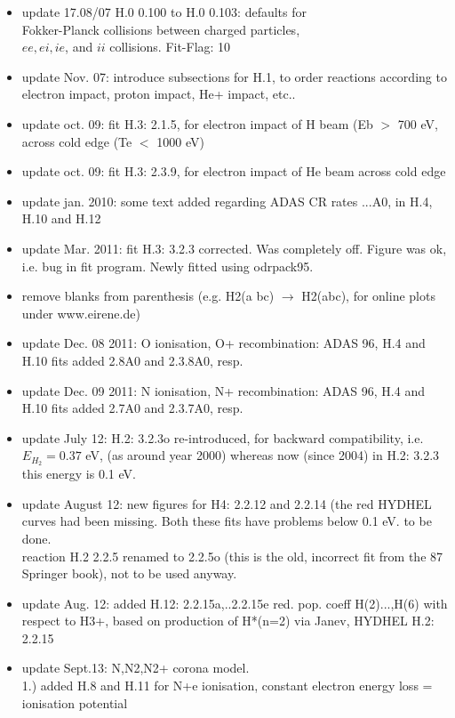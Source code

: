 \documentclass[12pt,dvips]{article}
\begin{document}
\begin{itemize}
  to be done: H.10 2.1.8 H.12 2.1.8de  (JH to be replaced by FU)
  \item update   17.08/07  H.0 0.100 to H.0 0.103: defaults for \\
  Fokker-Planck collisions between charged particles,\\
  $ee, ei, ie$, and $ii$ collisions. Fit-Flag: 10
  \item update Nov. 07:  introduce subsections for H.1, to order
  reactions according to electron impact, proton impact, He+ impact, etc..
  \item update oct. 09:  fit H.3: 2.1.5, for electron impact
  of H beam (Eb $>$ 700 eV, across cold edge (Te $<$ 1000 eV)
  \item update oct. 09:  fit H.3: 2.3.9, for electron impact
  of He beam across cold edge
  \item update jan. 2010: some text added regarding ADAS CR rates
  ...A0, in H.4, H.10 and H.12
  \item update Mar. 2011:  fit H.3: 3.2.3 corrected. Was completely off.
  Figure was ok, i.e. bug in fit program. Newly fitted using odrpack95.
  \item remove blanks from parenthesis (e.g. H2(a bc) $\rightarrow$ H2(abc), for online plots under www.eirene.de)
  \item update Dec. 08 2011:  O ionisation, O+ recombination: ADAS 96, H.4 and H.10 fits added 2.8A0 and 2.3.8A0, resp.
  \item update Dec. 09 2011:  N ionisation, N+ recombination: ADAS 96, H.4 and H.10 fits added 2.7A0 and 2.3.7A0, resp.
  \item update July 12:  H.2: 3.2.3o re-introduced, for backward compatibility, i.e. $E_{H_2}=0.37$ eV, (as around year 2000)
  whereas now (since 2004) in  H.2: 3.2.3 this energy is 0.1 eV.
  \item update August 12: new figures for H4: 2.2.12 and 2.2.14 (the red
  HYDHEL curves had been missing. Both these fits have problems below 0.1 eV. to be done.\\
  reaction H.2 2.2.5 renamed to 2.2.5o (this is the old, incorrect fit from the 87 Springer book),
  not to be used anyway.
  \item update Aug. 12: added H.12: 2.2.15a,..2.2.15e red. pop. coeff H(2)...,H(6) with respect to H3+,
  based on production of H*(n=2) via Janev, HYDHEL H.2: 2.2.15
  \item update Sept.13: N,N2,N2+ corona model. \\
  1.) added H.8 and H.11 for N+e ionisation, constant electron energy loss = ionisation potential\\

\end{itemize}
\end{document}
